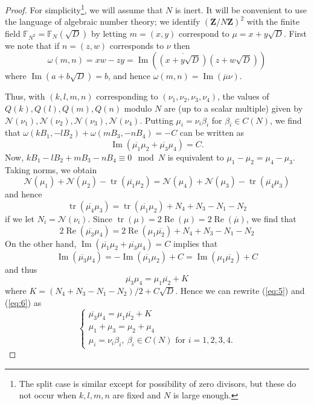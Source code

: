 \documentclass[12pt]{amsart}
\theoremstyle{plain}
\newcommand{\Z}{{\mathbf Z}}
\newcommand{\trace}{\operatorname{tr}}
\newcommand{\mnorm}{ {\mathcal N}} %
\newcommand{\torus}{C(N)} %
\newcommand{\re}{\operatorname{Re}}
\newcommand{\im}{\operatorname{Im}}
\renewcommand{\^}{\widehat}
\begin{document}
\begin{proof}
  For simplicity\footnote{ The split case is similar except for
    possibility of zero divisors, but these do not occur when
    $k,l,m,n$ are fixed and  $N$ is
    large enough.}, we will assume that $N$
is inert. 
%
It will be convenient to use the language of algebraic number theory;
we identify $(\Z/N\Z)^2$ with the finite field
$\mathbb{F}_{N^2} = \mathbb{F}_N(\sqrt{D})$ by
letting $m = (x,y)$ correspond to $\mu=x+y\sqrt{D}$.  First we note
that if $n=  
(z,w)$ corresponds to $\nu$ then 
$$
\omega(m,n) = xw-zy = %
\im(  \overline{(x+y\sqrt{D})} ( z+w\sqrt{D} ))
$$
where  $\im(a+b\sqrt{D})= b$, and hence $\omega(m,n) =
\im(\overline{\mu}{\nu})$. 

Thus, with $(k,l,m,n)$ corresponding to $(\nu_1,\nu_2,\nu_3,\nu_4)$,
the values of $Q(k), Q(l), Q(m), Q(n)$ modulo $N$ are (up to a scalar
multiple) given by $\mnorm(\nu_1), \mnorm(\nu_2), \mnorm(\nu_3),
\mnorm(\nu_4)$. Putting $\mu_i = \nu_i \beta_i$ for $\beta_i \in
\torus$, we 
find that $\omega(kB_1,-lB_2) +\omega(mB_3,-nB_4) = -C$ can be written
as
$$
\im(\overline{\mu_1} \mu_2 + \overline{\mu_3} \mu_4) = C.
$$
%
Now, $k B_1 - l B_2 + m B_3 - n B_4 \equiv 0 \mod N$ is equivalent to
$\mu_1 - \mu_2 = \mu_4 -\mu_3$.  Taking norms, we obtain
$$
\mnorm(\mu_1) + \mnorm( \mu_2) - \trace(\overline{\mu_1} \mu_2)
=
\mnorm(\mu_4) + \mnorm( \mu_3) - \trace(\overline{\mu_4} \mu_3)
$$
and hence
$$
\trace(\overline{\mu_4} \mu_3)
= 
\trace(\overline{\mu_1} \mu_2)+ N_4+N_3-N_1-N_2
$$
if we let $N_i = \mnorm (\nu_i)$.
Since $\trace(\mu) = 2 \re(\mu) = 2 \re(\overline{\mu})$, we find that
$$
2\re(\overline{\mu_3} \mu_4)
= 
2\re(\mu_1 \overline{\mu_2})+ N_4+N_3-N_1-N_2
$$
%
On the other hand,  $\im(\overline{\mu_1} \mu_2 + \overline{\mu_3} \mu_4) = C$
implies that  
$$
\im(\overline{\mu_3} \mu_4)
= -\im(\overline{\mu_1} \mu_2) + C =
\im(\mu_1 \overline{\mu_2}) + C
$$
%  
and thus
$$
\overline{\mu_3} \mu_4
=
\mu_1 \overline{\mu_2}
+K
$$
where $K = (N_4+N_3-N_1-N_2)/2 + C\sqrt{D}$.
%
Hence we can rewrite (\ref{eq:5}) and (\ref{eq:6}) as 
$$
\begin{cases}
\overline{\mu_3} \mu_4
=
\mu_1 \overline{\mu_2}
+K
\\
\mu_1 + \mu_3 = \mu_2 + \mu_4
\\
\mu_i = \nu_i \beta_i,  \ \beta_i \in \torus \text{ for $i=1,2,3,4$.}
\end{cases}
$$





\end{proof}
\end{document}
